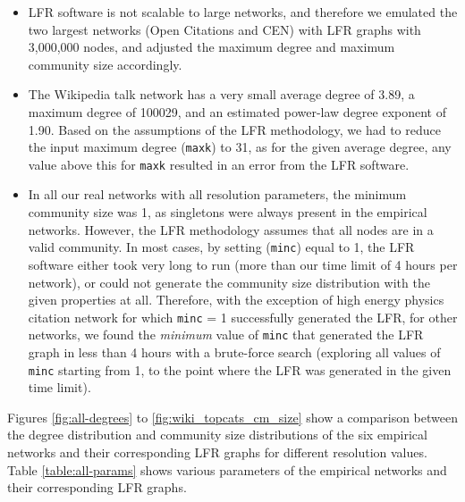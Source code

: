 \documentclass[a4paper]{article}   	%
\begin{document}
\begin{itemize}
    \item LFR software is not scalable to large networks, and therefore we emulated the two largest networks (Open Citations and CEN) with LFR graphs with 3,000,000 nodes, and adjusted the maximum degree and maximum community size accordingly.
    \item The Wikipedia talk network has a very small average degree of 3.89, a maximum degree of 100029, and an estimated power-law degree exponent of 1.90. Based on the assumptions of the LFR methodology, we had to reduce the input maximum degree (\texttt{maxk}) to 31, as for the given average degree, any value above this for \texttt{maxk} resulted in an error from the LFR software.
    \item In all our real networks with all resolution parameters, the minimum community size was 1, as singletons were always present in the empirical networks. However, the LFR methodology assumes that all nodes are in a valid community. In most cases, by setting (\texttt{minc}) equal to 1, the LFR software either took very long to run (more than our time limit of 4 hours per network), or could not generate the community size distribution with the given properties at all. Therefore, with the exception of high energy physics citation network for which \texttt{minc} = 1 successfully generated the LFR, for other networks, we found the \textit{minimum} value of \texttt{minc} that generated the LFR graph in less than 4 hours with a brute-force search (exploring all values of \texttt{minc} starting from 1, to the point where the LFR was generated in the given time limit).
\end{itemize}

Figures \ref{fig:all-degrees} to \ref{fig:wiki_topcats_cm_size} show a comparison between the degree distribution and community size distributions of the six empirical networks and their corresponding LFR graphs for different resolution values. Table \ref{table:all-params} shows various parameters of the empirical networks and their corresponding LFR graphs.
\end{document}
